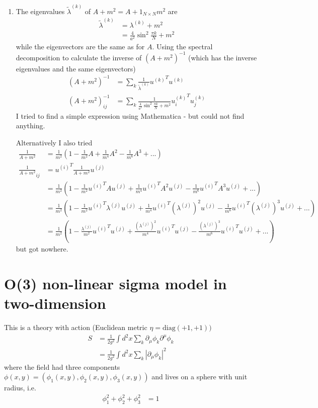 \documentclass[10pt,a4paper]{article}
\theoremstyle{definition}
\begin{document}
\begin{enumerate}[1.]
\item The eigenvalues $\tilde\lambda^{(k)}$ of $A+m^2=A+1_{N\times N}m^2$ are 
\begin{align}
\tilde\lambda^{(k)}
&=\lambda^{(k)}+m^2\\
&=\frac{4}{a^2}\sin^2\frac{\pi k}{N}+m^2
\end{align}
while the eigenvectors are the same as for $A$. Using the spectral decomposition to calculate the inverse of $(A+m^2)^{-1}$ (which has the inverse eigenvalues and the same eigenvectors)
\begin{align}
(A+m^2)^{-1}&=\sum_k\frac{1}{\tilde\lambda^{(k)}}{u^{(k)}}^Tu^{(k)}\\
(A+m^2)^{-1}_{ij}&=\sum_k\frac{1}{\frac{4}{a^2}\sin^2\frac{\pi k}{N}+m^2}{u^{(k)}_i}^Tu^{(k)}_j
\end{align}
I tried to find a simple expression using Mathematica - but could not find anything.

Alternatively I also tried
\begin{align}
\frac{1}{A+m^2}&=\frac{1}{m^2}\left(1-\frac{1}{m^2}A+\frac{1}{m^4}A^2-\frac{1}{m^6}A^3+...\right)\\
\frac{1}{A+m^2}_{ij}
&={u^{(i)}}^T\frac{1}{A+m^2}{u^{(j)}}\\
&=\frac{1}{m^2}\left(1-\frac{1}{m^2}{u^{(i)}}^TA{u^{(j)}}+\frac{1}{m^4}{u^{(i)}}^TA^2{u^{(j)}}-\frac{1}{m^6}{u^{(i)}}^TA^3{u^{(j)}}+...\right)\\
&=\frac{1}{m^2}\left(1-\frac{1}{m^2}{u^{(i)}}^T\lambda^{(j)}{u^{(j)}}+\frac{1}{m^4}{u^{(i)}}^T(\lambda^{(j)})^2{u^{(j)}}-\frac{1}{m^6}{u^{(i)}}^T(\lambda^{(j)})^3{u^{(j)}}+...\right)\\
&=\frac{1}{m^2}\left(1
-\frac{\lambda^{(j)}}{m^2}{u^{(i)}}^T{u^{(j)}}
+\frac{(\lambda^{(j)})^2}{m^4}{u^{(i)}}^T{u^{(j)}}
-\frac{(\lambda^{(j)})^3}{m^6}{u^{(i)}}^T{u^{(j)}}+...\right)
\end{align}
but got nowhere.
\end{enumerate}

\newpage
\section{O(3) non-linear sigma model in two-dimension}
This is a theory with action (Euclidean metric $\eta=\text{diag}(+1,+1))$
\begin{align}
S
&=\frac{1}{2g^2}\int d^2x \sum_k \partial_\mu \phi_k\partial^\mu \phi_k\\
&=\frac{1}{2g^2}\int d^2x \sum_k |\partial_\mu \phi_k|^2
\end{align}
where the field had three components $\phi(x,y) = ( \phi_1(x,y), \phi_2(x,y), \phi_3(x,y) )$ and lives on a sphere with unit radius, i.e.
\begin{align}
\phi_1^2+\phi_2^2+\phi_3^2 &= 1
\end{align}
\end{document}
